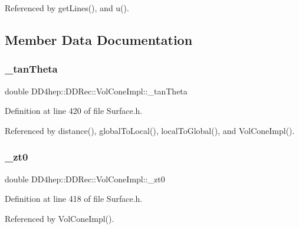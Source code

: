 Referenced by get\+Lines(), and u().



\subsection{Member Data Documentation}
\hypertarget{class_d_d4hep_1_1_d_d_rec_1_1_vol_cone_impl_a5f020df8481dcc088af7a02632f03ae2}{}\label{class_d_d4hep_1_1_d_d_rec_1_1_vol_cone_impl_a5f020df8481dcc088af7a02632f03ae2} 
\subsubsection{\texorpdfstring{\+\_\+tan\+Theta}{\_tanTheta}}
{\footnotesize\ttfamily double D\+D4hep\+::\+D\+D\+Rec\+::\+Vol\+Cone\+Impl\+::\+\_\+tan\+Theta\hspace{0.3cm}{\ttfamily [private]}}



Definition at line 420 of file Surface.\+h.



Referenced by distance(), global\+To\+Local(), local\+To\+Global(), and Vol\+Cone\+Impl().

\hypertarget{class_d_d4hep_1_1_d_d_rec_1_1_vol_cone_impl_ad204cc67411301eaa8f135430392a55c}{}\label{class_d_d4hep_1_1_d_d_rec_1_1_vol_cone_impl_ad204cc67411301eaa8f135430392a55c} 
\subsubsection{\texorpdfstring{\+\_\+zt0}{\_zt0}}
{\footnotesize\ttfamily double D\+D4hep\+::\+D\+D\+Rec\+::\+Vol\+Cone\+Impl\+::\+\_\+zt0\hspace{0.3cm}{\ttfamily [private]}}



Definition at line 418 of file Surface.\+h.



Referenced by Vol\+Cone\+Impl().

\hypertarget{class_d_d4hep_1_1_d_d_rec_1_1_vol_cone_impl_aa9466fe65e7238bf90ec604132ea1825}{}\label{class_d_d4hep_1_1_d_d_rec_1_1_vol_cone_impl_aa9466fe65e7238bf90ec604132ea1825} 
